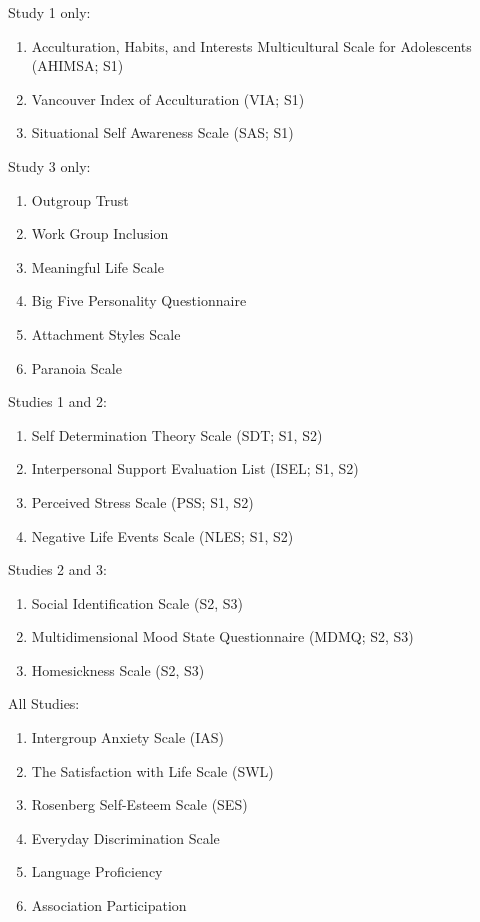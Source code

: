 \documentclass[]{article}
\providecommand{\tightlist}{%
\setlength{\itemsep}{0pt}\setlength{\parskip}{0pt}}
\begin{document}
\color{editPurple}

Study 1 only:

\begin{enumerate}
\def\labelenumi{\arabic{enumi}.}
\tightlist
\item
  Acculturation, Habits, and Interests Multicultural Scale for
  Adolescents (AHIMSA; S1)
\item
  Vancouver Index of Acculturation (VIA; S1)
\item
  Situational Self Awareness Scale (SAS; S1)
\end{enumerate}

Study 3 only:

\begin{enumerate}
\def\labelenumi{\arabic{enumi}.}
\tightlist
\item
  Outgroup Trust
\item
  Work Group Inclusion
\item
  Meaningful Life Scale
\item
  Big Five Personality Questionnaire
\item
  Attachment Styles Scale
\item
  Paranoia Scale
\end{enumerate}

Studies 1 and 2:

\begin{enumerate}
\def\labelenumi{\arabic{enumi}.}
\tightlist
\item
  Self Determination Theory Scale (SDT; S1, S2)
\item
  Interpersonal Support Evaluation List (ISEL; S1, S2)
\item
  Perceived Stress Scale (PSS; S1, S2)
\item
  Negative Life Events Scale (NLES; S1, S2)
\end{enumerate}

Studies 2 and 3:

\begin{enumerate}
\def\labelenumi{\arabic{enumi}.}
\tightlist
\item
  Social Identification Scale (S2, S3)
\item
  Multidimensional Mood State Questionnaire (MDMQ; S2, S3)
\item
  Homesickness Scale (S2, S3)
\end{enumerate}

All Studies:

\begin{enumerate}
\def\labelenumi{\arabic{enumi}.}
\tightlist
\item
  Intergroup Anxiety Scale (IAS)
\item
  The Satisfaction with Life Scale (SWL)
\item
  Rosenberg Self-Esteem Scale (SES)
\item
  Everyday Discrimination Scale
\item
  Language Proficiency
\item
  Association Participation
\end{enumerate}
\end{document}
